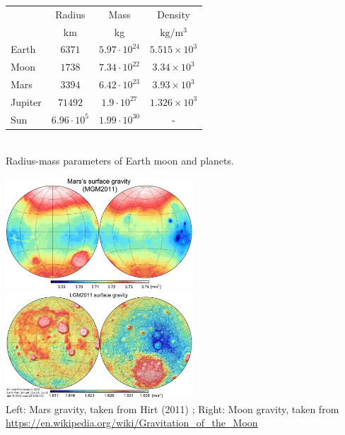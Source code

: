 \vspace{0.5cm}

\begin{center}
  \begin{tabular}{|l|c|c|c|} \hline
               & Radius & Mass & Density \\ 
               & km   & kg & $\mathrm{kg/m^3}$\\ \hline
     Earth   & $6371$ & $5.97 \cdot 10^{24}$ & $5.515 \times 10^3$ \\
     Moon    & $1738$ & $7.34 \cdot 10^{22}$ & $3.34  \times 10^3$ \\ 
     Mars    & $3394$ & $6.42 \cdot 10^{23}$ & $3.93  \times 10^3$ \\
     Jupiter &$71492$ & $1.9  \cdot 10^{27}$ & $1.326 \times 10^3$ \\
     Sun     &$6.96\cdot 10^5$ 
                      & $1.99 \cdot 10^{30}$ &        -            \\
  \hline
  \end{tabular} \\
{ \captionfont Radius-mass parameters of Earth moon and planets.}
\end{center}


\begin{center}
\includegraphics[width=7cm]{images/gravity/marsgravity}
\includegraphics[width=7cm]{images/gravity/moongravity}\\
{\captionfont Left: Mars gravity, taken from Hirt \etal (2011) \cite{hick12}; 
Right: Moon gravity, taken from \url{https://en.wikipedia.org/wiki/Gravitation_of_the_Moon}}
\end{center}


